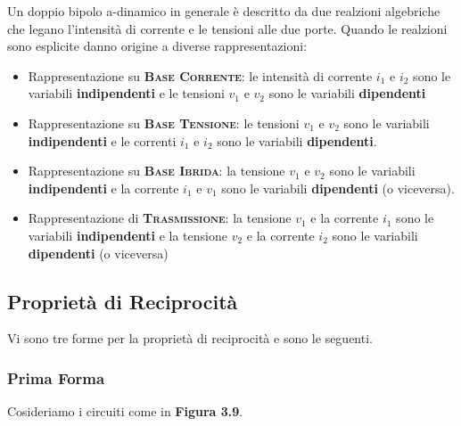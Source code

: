 \documentclass[a4paper]{report}
\begin{document}
Un doppio bipolo a-dinamico in generale \`e descritto da due realzioni
algebriche che legano l'intensit\`a di corrente e le tensioni alle due
porte. Quando le realzioni sono esplicite danno origine a diverse
rappresentazioni:

\begin{itemize}
  \item Rappresentazione su {\textsc{\bf Base Corrente}}: le
    intensit\`a di corrente $i_1$ e $i_2$ sono le variabili {\bf
      indipendenti} e le tensioni $v_1$ e $v_2$ sono le variabili {\bf
    dipendenti}
  \item Rappresentazione su {\textsc{\bf Base Tensione}}: le tensioni
    $v_1$ e $v_2$ sono le variabili {\bf indipendenti} e le correnti
    $i_1$ e $i_2$ sono le variabili {\bf dipendenti}.
  \item Rappresentazione su {\textsc{\bf Base Ibrida}}: la tensione
    $v_1$ e $v_2$ sono le variabili {\bf indipendenti} e la corrente
    $i_1$ e $v_1$ sono le variabili {\bf dipendenti} (o viceversa).
  \item Rappresentazione di {\textsc{\bf Trasmissione}}: la tensione
    $v_1$ e la corrente $i_1$ sono le variabili {\bf indipendenti} e
    la tensione $v_2$ e la corrente $i_2$ sono le variabili {\bf
      dipendenti} (o viceversa)
\end{itemize}

\subsection{Propriet\`a di Reciprocit\`a}

Vi sono tre forme per la propriet\`a di reciprocit\`a e sono le
seguenti.

\subsubsection{Prima Forma}\label{subsubsec:repPrimaForma}
Cosideriamo i circuiti come in {\bf Figura 3.9}.
\end{document}
